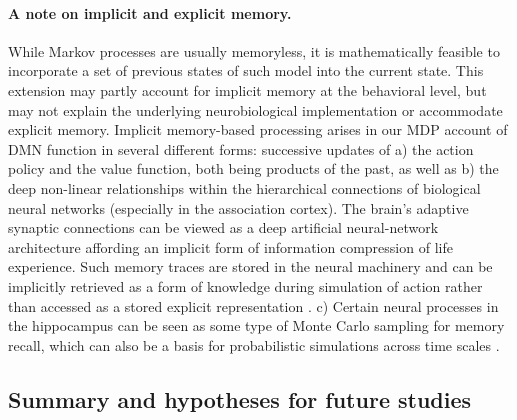 \documentclass[10pt,letterpaper]{article}
\begin{document}
\paragraph*{A note on implicit and explicit memory.}
While Markov processes are usually memoryless, it is mathematically feasible to
incorporate a set of previous states of such model into the current state. This
extension may partly account for implicit memory at the behavioral level, but
may not explain the underlying neurobiological implementation or accommodate
explicit memory. Implicit memory-based processing arises in our MDP account of
DMN function in several different forms: successive updates of a) the action
policy and the value function, both being products of the past, as well as b)
the deep non-linear relationships within the hierarchical connections of
biological neural networks (especially in the association cortex).
The brain's adaptive synaptic connections can be
viewed as a deep artificial neural-network architecture affording an implicit form of
information compression of life experience. Such memory traces are stored in the
neural machinery and can be implicitly retrieved as a form of knowledge during
simulation of action rather than accessed as a stored explicit representation
\citep{pezzulo2011grounding}. c) Certain neural processes in the hippocampus can
be seen as some type of Monte Carlo sampling for memory recall, which can also
be a basis for probabilistic simulations across time scales
\citep{schacter2007remembering,Axelrod2017}.


\subsection{Summary and hypotheses for future studies}
\end{document}
